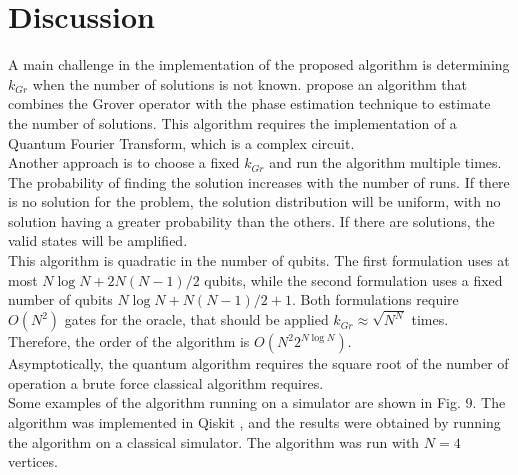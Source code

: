 \documentclass[10pt,a4paper]{article}
\begin{document}
\section{Discussion}
A main challenge in the implementation of the proposed algorithm is determining $k_{Gr}$ when the number of solutions is not known. \cite{Nielsen_Chuang_2010} propose an algorithm that combines the Grover operator with the phase estimation technique to estimate the number of solutions. This algorithm requires the implementation of a Quantum Fourier Transform, which is a complex circuit.\\
Another approach is to choose a fixed $k_{Gr}$ and run the algorithm multiple times. The probability of finding the solution increases with the number of runs. If there is no solution for the problem, the solution distribution will be uniform, with no solution having a greater probability than the others. If there are solutions, the valid states will be amplified.\\
This algorithm is quadratic in the number of qubits. The first formulation uses at most $N\log{N} + 2 N(N-1)/2$ qubits, while the second formulation uses a fixed number of qubits $N \log{N} + N(N-1)/2 + 1$. Both formulations require $O(N^2)$ gates for the oracle, that should be applied $k_{Gr}\approx \sqrt{N^N}$ times. Therefore, the order of the algorithm is $O(N^2 2^{N \log N})$.\\
Asymptotically, the quantum algorithm requires the square root of the number of operation a brute force classical algorithm requires. \\
Some examples of the algorithm running on a simulator are shown in Fig. 9. The algorithm was implemented in Qiskit \cite{Qiskit}, and the results were obtained by running the algorithm on a classical simulator. The algorithm was run with $N = 4$ vertices.



 

\end{document}
